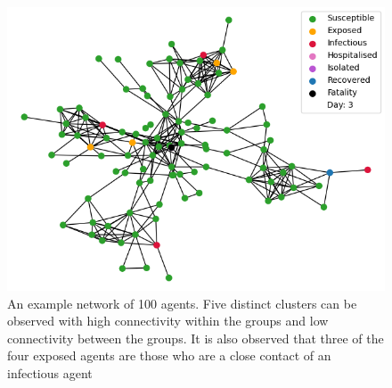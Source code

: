 \documentclass{article}
\begin{document}
\begin{figure}[h!]
\centering
\includegraphics[width=\textwidth]{network}
\caption{An example network of 100 agents. Five distinct clusters can be observed with high connectivity within the groups and low connectivity between the groups. It is also observed that three of the four exposed agents are those who are a close contact of an infectious agent}
\end{figure}
\end{document}
